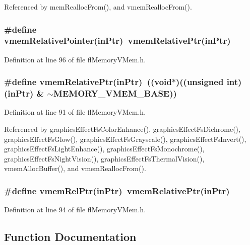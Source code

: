 Referenced by mem\-Realloc\-From(), and vmem\-Realloc\-From().
\subsubsection{\setlength{\rightskip}{0pt plus 5cm}\#define vmem\-Relative\-Pointer(in\-Ptr)~vmem\-Relative\-Ptr(in\-Ptr)}\label{flMemoryVMem_8h_be9d6ce7faa2898747ddb084ae27e171}




Definition at line 96 of file fl\-Memory\-VMem.h.
\subsubsection{\setlength{\rightskip}{0pt plus 5cm}\#define vmem\-Relative\-Ptr(in\-Ptr)~((void$\ast$)((unsigned int)(in\-Ptr) \& $\sim$MEMORY\_\-VMEM\_\-BASE))}\label{flMemoryVMem_8h_68a79a04d9a164853141036057265693}




Definition at line 91 of file fl\-Memory\-VMem.h.

Referenced by graphics\-Effect\-Fs\-Color\-Enhance(), graphics\-Effect\-Fs\-Dichrome(), graphics\-Effect\-Fs\-Glow(), graphics\-Effect\-Fs\-Grayscale(), graphics\-Effect\-Fs\-Invert(), graphics\-Effect\-Fs\-Light\-Enhance(), graphics\-Effect\-Fs\-Monochrome(), graphics\-Effect\-Fs\-Night\-Vision(), graphics\-Effect\-Fs\-Thermal\-Vision(), vmem\-Alloc\-Buffer(), and vmem\-Realloc\-From().
\subsubsection{\setlength{\rightskip}{0pt plus 5cm}\#define vmem\-Rel\-Ptr(in\-Ptr)~vmem\-Relative\-Ptr(in\-Ptr)}\label{flMemoryVMem_8h_8f6c1b1e4fb905f39608a1163c2a5624}




Definition at line 94 of file fl\-Memory\-VMem.h.

\subsection{Function Documentation}
